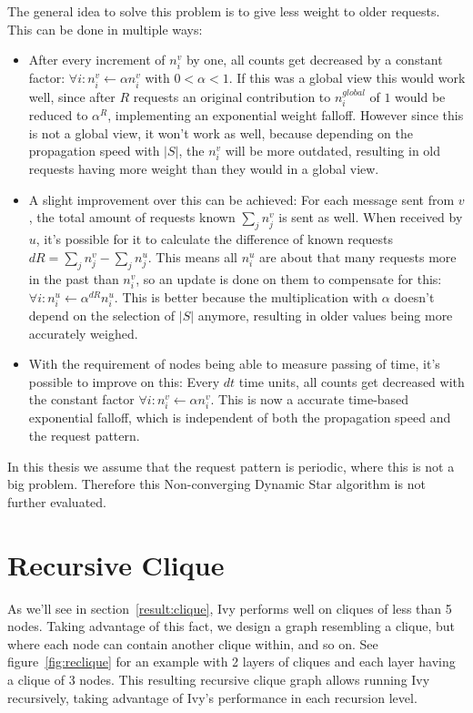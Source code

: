 \documentclass[a4paper, oneside]{discothesis}
\begin{document}
The general idea to solve this problem is to give less weight to older requests. This can be done in multiple ways:
\begin{itemize}
\item After every increment of $n_i^v$ by one, all counts get decreased by a constant factor: $\forall i:n_i^v\gets \alpha n_i^v$ with $0<\alpha<1$. If this was a global view this would work well, since after $R$ requests an original contribution to $n_i^{global}$ of $1$ would be reduced to $\alpha^R$, implementing an exponential weight falloff. However since this is not a global view, it won't work as well, because depending on the propagation speed with $|S|$, the $n_i^v$ will be more outdated, resulting in old requests having more weight than they would in a global view.
\item A slight improvement over this can be achieved: For each message sent from $v$, the total amount of requests known $\sum_jn_j^v$ is sent as well. When received by $u$, it's possible for it to calculate the difference of known requests $dR=\sum_jn_j^v-\sum_jn_j^u$. This means all $n_i^u$ are about that many requests more in the past than $n_i^v$, so an update is done on them to compensate for this: $\forall i:n_i^u\gets\alpha^{dR}n_i^u$. This is better because the multiplication with $\alpha$ doesn't depend on the selection of $|S|$ anymore, resulting in older values being more accurately weighed.
\item With the requirement of nodes being able to measure passing of time, it's possible to improve on this: Every $dt$ time units, all counts get decreased with the constant factor $\forall i:n_i^v\gets \alpha n_i^v$. This is now a accurate time-based exponential falloff, which is independent of both the propagation speed and the request pattern.
\end{itemize}

In this thesis we assume that the request pattern is periodic, where this is not a big problem. Therefore this Non-converging Dynamic Star algorithm is not further evaluated.

\section{Recursive Clique}

As we'll see in section~\ref{result:clique}, Ivy performs well on cliques of less than 5 nodes. Taking advantage of this fact, we design a graph resembling a clique, but where each node can contain another clique within, and so on. See figure~\ref{fig:reclique} for an example with 2 layers of cliques and each layer having a clique of 3 nodes. This resulting recursive clique graph allows running Ivy recursively, taking advantage of Ivy's performance in each recursion level.
\end{document}
